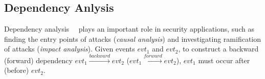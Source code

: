 \subsection{Dependency Anlysis}
Dependency analysis~~\cite{backtracking,backtrackingfile,backtracking2} plays an important role in security applications,
such as finding the entry points of attacks (\emph{causal analysis})
and investigating ramification of attacks (\emph{impact analysis}).
Given events $evt_1$ and $evt_2$, to construct a backward (forward) dependency $evt_1\xrightarrow{backward} evt_2$ ($evt_1\xrightarrow{forward} evt_2$), $evt_1$ must occur after (before) $evt_2$.

